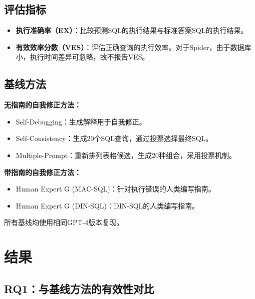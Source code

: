 \subsection{评估指标}
\begin{itemize}
    \item \textbf{执行准确率（EX）}：比较预测SQL的执行结果与标准答案SQL的执行结果。
    \item \textbf{有效效率分数（VES）}：评估正确查询的执行效率。对于Spider，由于数据库小，执行时间差异可忽略，故不报告VES。
\end{itemize}

\subsection{基线方法}
\textbf{无指南的自我修正方法：}
\begin{itemize}
    \item Self-Debugging：生成解释用于自我修正。
    \item Self-Consistency：生成20个SQL查询，通过投票选择最终SQL。
    \item Multiple-Prompt：重新排列表格候选，生成20种组合，采用投票机制。
\end{itemize}
\textbf{带指南的自我修正方法：}
\begin{itemize}
    \item Human Expert G (MAC-SQL)：针对执行错误的人类编写指南。
    \item Human Expert G (DIN-SQL)：DIN-SQL的人类编写指南。
\end{itemize}
所有基线均使用相同GPT-4版本复现。

\section{结果}

\subsection{RQ1：与基线方法的有效性对比}

